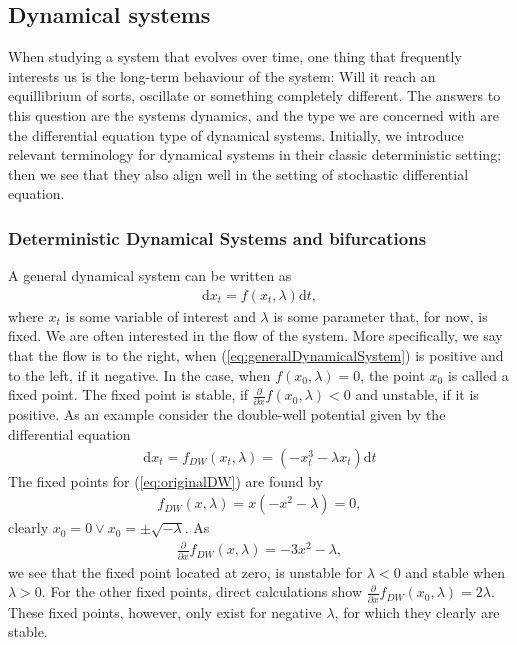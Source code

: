 \subsection{Dynamical systems}
When studying a system that evolves over time, one thing that frequently interests us is the long-term behaviour of the system: Will it reach an equillibrium of sorts, oscillate or something completely different. The answers to this question are the systems dynamics, and the type we are concerned with are the differential equation type of dynamical systems. Initially, we introduce relevant terminology for dynamical systems in their classic deterministic setting; then we see that they also align well in the setting of stochastic differential equation. 
\subsubsection{Deterministic Dynamical Systems and bifurcations}
A general dynamical system can be written as
\begin{align}
    \mathrm{d}x_t = f(x_t, \lambda)\mathrm{d}t, \label{eq:generalDynamicalSystem}
\end{align}
where $x_t$ is some variable of interest and $\lambda$ is some parameter that, for now, is fixed. We are often interested in the flow of the system. More specifically, we say that the flow is to the right, when (\ref{eq:generalDynamicalSystem}) is positive and to the left, if it negative. In the case, when $f(x_0, \lambda) = 0$, the point $x_0$ is called a fixed point. The fixed point is stable, if $\frac{\partial}{\partial x}f(x_0, \lambda) < 0$ and unstable, if it is positive. As an example consider the double-well potential given by the differential equation 
\begin{align}
    \mathrm{d}x_t = f_{DW}(x_t, \lambda) = \left(-x_t^3 - \lambda x_t\right) \mathrm{d}t \label{eq:originalDW}
\end{align}
The fixed points for (\ref{eq:originalDW}) are found by 
\begin{align}
    f_{DW}(x, \lambda) = x\left(-x^2 - \lambda\right) = 0,
\end{align}
clearly $x_0 = 0 \lor x_0 = \pm \sqrt{-\lambda}$. As 
\begin{align}
    \frac{\partial}{\partial x}f_{DW}(x, \lambda) = -3x^2 - \lambda,
\end{align}
we see that the fixed point located at zero, is unstable for $\lambda<0$ and stable when $\lambda>0$. For the other fixed points, direct calculations show $\frac{\partial}{\partial x}f_{DW}(x_0, \lambda) = 2\lambda$. These fixed points, however, only exist for negative $\lambda$, for which they clearly are stable. 
